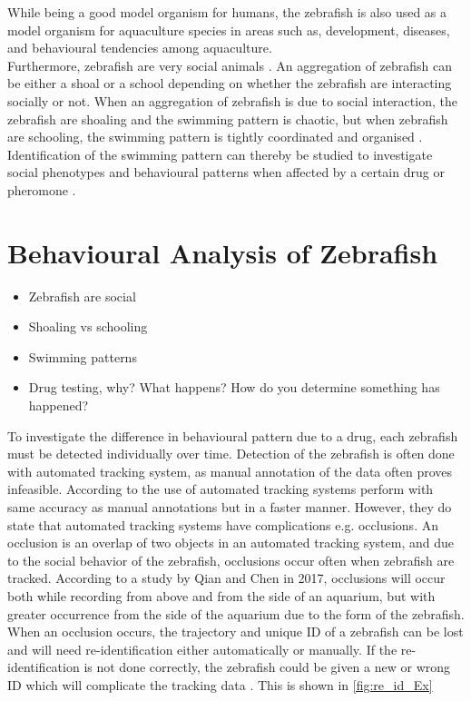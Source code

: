 While being a good model organism for humans, the zebrafish is also used as a model organism for aquaculture species in areas such as, development, diseases, and behavioural tendencies among aquaculture.\\ 


Furthermore, zebrafish are very social animals \citep{RahmanKhan2018}. An aggregation of zebrafish can be either a shoal or a school depending on whether the zebrafish are interacting socially or not. When an aggregation of zebrafish is due to social interaction, the zebrafish are shoaling and the swimming pattern is chaotic, but when zebrafish are schooling, the swimming pattern is tightly coordinated and organised \citep{Kulkarni2018}. Identification of the swimming pattern can thereby be studied to investigate social phenotypes and behavioural patterns when affected by a certain drug or pheromone \citep{RahmanKhan2018}.\\


\section{Behavioural Analysis of Zebrafish}

\begin{itemize}
	\item Zebrafish are social
	\item Shoaling vs schooling
	\item Swimming patterns
	\item Drug testing, why? What happens? How do you determine something has happened?
\end{itemize}

To investigate the difference in behavioural pattern due to a drug, each zebrafish must be detected individually over time. Detection of the zebrafish is often done with automated tracking system, as manual annotation of the data often proves infeasible. According to  \cite{Green2012} the use of automated tracking systems perform with same accuracy as manual annotations but in a faster manner. However, they do state that automated tracking systems have complications e.g. occlusions. An occlusion is an overlap of two objects in an automated tracking system, and due to the social behavior of the zebrafish, occlusions occur often when zebrafish are tracked. According to a study by Qian and Chen in 2017, occlusions will occur both while recording from above and from the side of an aquarium, but with greater occurrence from the side of the aquarium due to the form of the zebrafish.  When an occlusion occurs, the trajectory and unique ID of a zebrafish can be lost and will need re-identification either automatically or manually. If the re-identification is not done correctly, the zebrafish could be given a new or wrong ID which will complicate the tracking data \citep{Feijo2018}. This is shown in \autoref{fig:re_id_Ex}

